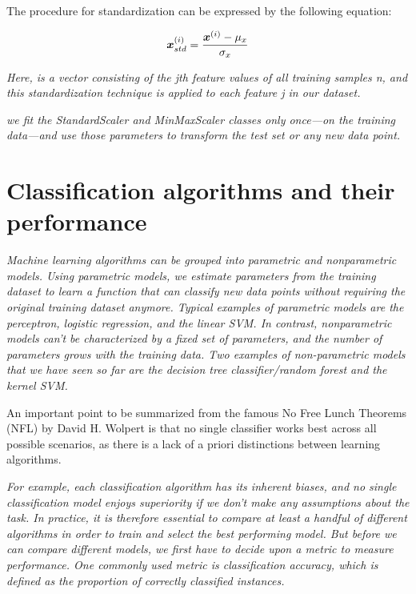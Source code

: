 The procedure for standardization can be expressed by the following equation:

\begin{equation} \label{eq:standardization}
    \boldsymbol{x}^{(i)}_{std} = \frac{\boldsymbol{x}^{(i)} - \mu_x}{\sigma_x}
\end{equation}

\textit{Here,  is a vector consisting of the jth feature values of all training samples n, and this standardization technique is applied to each feature j in our dataset.}

\textit{we fit the StandardScaler and MinMaxScaler classes only once—on the training data—and use those parameters to transform the test set or any new data point.}

\section{Classification algorithms and their performance} \label{sec:classification_algorithms_performance}

\textit{Machine learning algorithms can be grouped into parametric and nonparametric models. Using parametric models, we estimate parameters from the training dataset to learn a function that can classify new data points without requiring the original training dataset anymore. Typical examples of parametric models are the perceptron, logistic regression, and the linear SVM. In contrast, nonparametric models can't be characterized by a fixed set of parameters, and the number of parameters grows with the training data. Two examples of non-parametric models that we have seen so far are the decision tree classifier/random forest and the kernel SVM.}

An important point to be summarized from the famous No Free Lunch Theorems (NFL)\cite{Wolpert1996,Wolpert1997} by David H. Wolpert is that no single classifier works best across all possible scenarios, as there is a lack of a priori distinctions between learning algorithms.

\textit{For example, each classification algorithm has its inherent biases, and no single classification model enjoys superiority if we don't make any assumptions about the task. In practice, it is therefore essential to compare at least a handful of different algorithms in order to train and select the best performing model. But before we can compare different models, we first have to decide upon a metric to measure performance. One commonly used metric is classification accuracy, which is defined as the proportion of correctly classified instances.}

